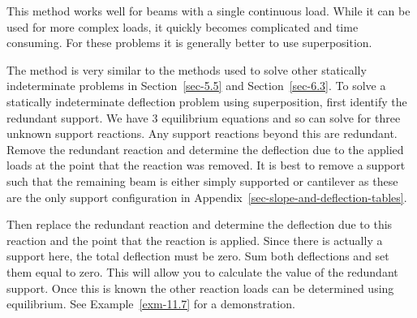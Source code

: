 \documentclass[
  letterpaper,
  DIV=11,
  numbers=noendperiod]{scrreprt}
\theoremstyle{definition}
\theoremstyle{remark}
\begin{document}
This method works well for beams with a single continuous load. While it
can be used for more complex loads, it quickly becomes complicated and
time consuming. For these problems it is generally better to use
superposition.

The method is very similar to the methods used to solve other statically
indeterminate problems in Section~\ref{sec-5.5} and
Section~\ref{sec-6.3}. To solve a statically indeterminate deflection
problem using superposition, first identify the redundant support. We
have 3 equilibrium equations and so can solve for three unknown support
reactions. Any support reactions beyond this are redundant. Remove the
redundant reaction and determine the deflection due to the applied loads
at the point that the reaction was removed. It is best to remove a
support such that the remaining beam is either simply supported or
cantilever as these are the only support configuration in
Appendix~\ref{sec-slope-and-deflection-tables}.

Then replace the redundant reaction and determine the deflection due to
this reaction and the point that the reaction is applied. Since there is
actually a support here, the total deflection must be zero. Sum both
deflections and set them equal to zero. This will allow you to calculate
the value of the redundant support. Once this is known the other
reaction loads can be determined using equilibrium. See
Example~\ref{exm-11.7} for a demonstration.
\end{document}
